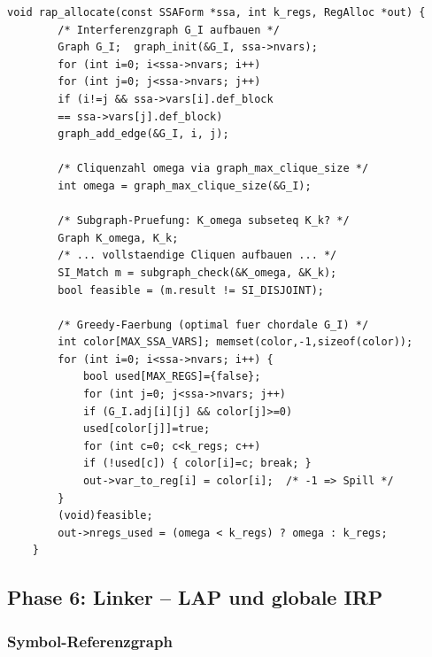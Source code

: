 ﻿\documentclass[a4paper,12pt]{article}
\theoremstyle{definition}
\begin{document}
\begin{lstlisting}[style=cstyle, caption={RAP -- Cliquen-SI und Greedy-FÃ¤rbung
		(compiler\_full.c)}, label=lst:rap-impl]
	void rap_allocate(const SSAForm *ssa, int k_regs, RegAlloc *out) {
		/* Interferenzgraph G_I aufbauen */
		Graph G_I;  graph_init(&G_I, ssa->nvars);
		for (int i=0; i<ssa->nvars; i++)
		for (int j=0; j<ssa->nvars; j++)
		if (i!=j && ssa->vars[i].def_block
		== ssa->vars[j].def_block)
		graph_add_edge(&G_I, i, j);
		
		/* Cliquenzahl omega via graph_max_clique_size */
		int omega = graph_max_clique_size(&G_I);
		
		/* Subgraph-Pruefung: K_omega subseteq K_k? */
		Graph K_omega, K_k;
		/* ... vollstaendige Cliquen aufbauen ... */
		SI_Match m = subgraph_check(&K_omega, &K_k);
		bool feasible = (m.result != SI_DISJOINT);
		
		/* Greedy-Faerbung (optimal fuer chordale G_I) */
		int color[MAX_SSA_VARS]; memset(color,-1,sizeof(color));
		for (int i=0; i<ssa->nvars; i++) {
			bool used[MAX_REGS]={false};
			for (int j=0; j<ssa->nvars; j++)
			if (G_I.adj[i][j] && color[j]>=0)
			used[color[j]]=true;
			for (int c=0; c<k_regs; c++)
			if (!used[c]) { color[i]=c; break; }
			out->var_to_reg[i] = color[i];  /* -1 => Spill */
		}
		(void)feasible;
		out->nregs_used = (omega < k_regs) ? omega : k_regs;
	}
\end{lstlisting}

\subsection{Phase 6: Linker -- LAP und globale IRP}
\label{sec:impl-lap}

\subsubsection{Symbol-Referenzgraph}
\end{document}
